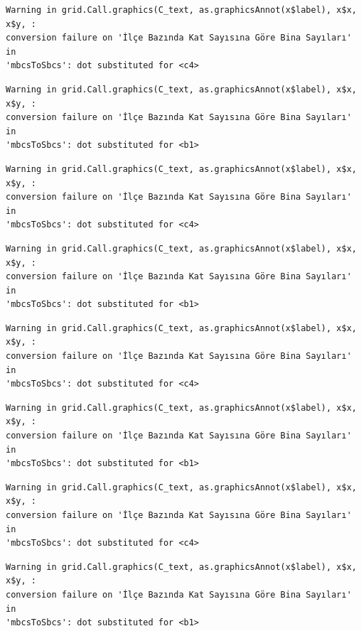 \documentclass[
  11pt,
  a4paper,
  DIV=11,
  numbers=noendperiod]{scrartcl}
\begin{document}
\begin{verbatim}
Warning in grid.Call.graphics(C_text, as.graphicsAnnot(x$label), x$x, x$y, :
conversion failure on 'İlçe Bazında Kat Sayısına Göre Bina Sayıları' in
'mbcsToSbcs': dot substituted for <c4>
\end{verbatim}

\begin{verbatim}
Warning in grid.Call.graphics(C_text, as.graphicsAnnot(x$label), x$x, x$y, :
conversion failure on 'İlçe Bazında Kat Sayısına Göre Bina Sayıları' in
'mbcsToSbcs': dot substituted for <b1>
\end{verbatim}

\begin{verbatim}
Warning in grid.Call.graphics(C_text, as.graphicsAnnot(x$label), x$x, x$y, :
conversion failure on 'İlçe Bazında Kat Sayısına Göre Bina Sayıları' in
'mbcsToSbcs': dot substituted for <c4>
\end{verbatim}

\begin{verbatim}
Warning in grid.Call.graphics(C_text, as.graphicsAnnot(x$label), x$x, x$y, :
conversion failure on 'İlçe Bazında Kat Sayısına Göre Bina Sayıları' in
'mbcsToSbcs': dot substituted for <b1>
\end{verbatim}

\begin{verbatim}
Warning in grid.Call.graphics(C_text, as.graphicsAnnot(x$label), x$x, x$y, :
conversion failure on 'İlçe Bazında Kat Sayısına Göre Bina Sayıları' in
'mbcsToSbcs': dot substituted for <c4>
\end{verbatim}

\begin{verbatim}
Warning in grid.Call.graphics(C_text, as.graphicsAnnot(x$label), x$x, x$y, :
conversion failure on 'İlçe Bazında Kat Sayısına Göre Bina Sayıları' in
'mbcsToSbcs': dot substituted for <b1>
\end{verbatim}

\begin{verbatim}
Warning in grid.Call.graphics(C_text, as.graphicsAnnot(x$label), x$x, x$y, :
conversion failure on 'İlçe Bazında Kat Sayısına Göre Bina Sayıları' in
'mbcsToSbcs': dot substituted for <c4>
\end{verbatim}

\begin{verbatim}
Warning in grid.Call.graphics(C_text, as.graphicsAnnot(x$label), x$x, x$y, :
conversion failure on 'İlçe Bazında Kat Sayısına Göre Bina Sayıları' in
'mbcsToSbcs': dot substituted for <b1>
\end{verbatim}
\end{document}
